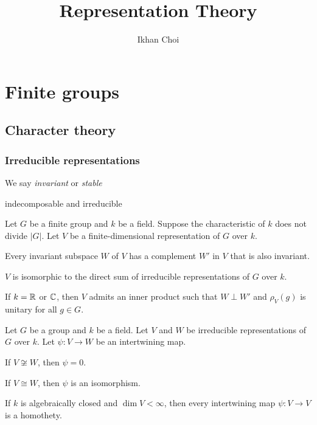 \documentclass{../../large}
\begin{document}
\title{Representation Theory}
\author{Ikhan Choi}
\maketitle
\tableofcontents

\part{Finite groups}
\chapter{Character theory}

\section{Irreducible representations}
\begin{prb}
\end{prb}

\begin{prb}
\end{prb}

\begin{prb}[Subrepresentations]
We say \emph{invariant} or \emph{stable}
\end{prb}

\begin{prb}
indecomposable and irreducible
\end{prb}

\begin{prb}
Let $G$ be a finite group and $k$ be a field.
Suppose the characteristic of $k$ does not divide $|G|$.
Let $V$ be a finite-dimensional representation of $G$ over $k$.
\begin{parts}
\item Every invariant subspace $W$ of $V$ has a complement $W'$ in $V$ that is also invariant.
\item $V$ is isomorphic to the direct sum of irreducible representations of $G$ over $k$.
\item If $k=\mathbb{R}$ or $\mathbb{C}$, then $V$ admits an inner product such that $W\perp W'$ and $\rho_V(g)$ is unitary for all $g\in G$.
\end{parts}
\end{prb}

\begin{prb}
Let $G$ be a group and $k$ be a field.
Let $V$ and $W$ be irreducible representations of $G$ over $k$.
Let $\psi:V\to W$ be an intertwining map.
\begin{parts}
\item If $V\not\cong W$, then $\psi=0$.
\item If $V\cong W$, then $\psi$ is an isomorphism.
\item If $k$ is algebraically closed and $\dim V<\infty$, then every intertwining map $\psi:V\to V$ is a homothety.
\end{parts}
\end{prb}
\end{document}
